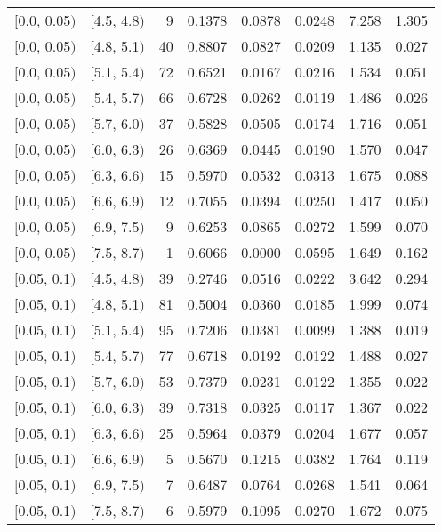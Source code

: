 \begin{longtable}{| l | l | r | r | r | r | r | r |}
        $[$0.0, 0.05$)$ & $[$4.5, 4.8$)$ & 9 & 0.1378 & 0.0878 & 0.0248 & 7.258 & 1.305 \\
        $[$0.0, 0.05$)$ & $[$4.8, 5.1$)$ & 40 & 0.8807 & 0.0827 & 0.0209 & 1.135 & 0.027 \\
        $[$0.0, 0.05$)$ & $[$5.1, 5.4$)$ & 72 & 0.6521 & 0.0167 & 0.0216 & 1.534 & 0.051 \\
        $[$0.0, 0.05$)$ & $[$5.4, 5.7$)$ & 66 & 0.6728 & 0.0262 & 0.0119 & 1.486 & 0.026 \\
        $[$0.0, 0.05$)$ & $[$5.7, 6.0$)$ & 37 & 0.5828 & 0.0505 & 0.0174 & 1.716 & 0.051 \\
        $[$0.0, 0.05$)$ & $[$6.0, 6.3$)$ & 26 & 0.6369 & 0.0445 & 0.0190 & 1.570 & 0.047 \\
        $[$0.0, 0.05$)$ & $[$6.3, 6.6$)$ & 15 & 0.5970 & 0.0532 & 0.0313 & 1.675 & 0.088 \\
        $[$0.0, 0.05$)$ & $[$6.6, 6.9$)$ & 12 & 0.7055 & 0.0394 & 0.0250 & 1.417 & 0.050 \\
        $[$0.0, 0.05$)$ & $[$6.9, 7.5$)$ & 9 & 0.6253 & 0.0865 & 0.0272 & 1.599 & 0.070 \\
        $[$0.0, 0.05$)$ & $[$7.5, 8.7$)$ & 1 & 0.6066 & 0.0000 & 0.0595 & 1.649 & 0.162 \\
        $[$0.05, 0.1$)$ & $[$4.5, 4.8$)$ & 39 & 0.2746 & 0.0516 & 0.0222 & 3.642 & 0.294 \\
        $[$0.05, 0.1$)$ & $[$4.8, 5.1$)$ & 81 & 0.5004 & 0.0360 & 0.0185 & 1.999 & 0.074 \\
        $[$0.05, 0.1$)$ & $[$5.1, 5.4$)$ & 95 & 0.7206 & 0.0381 & 0.0099 & 1.388 & 0.019 \\
        $[$0.05, 0.1$)$ & $[$5.4, 5.7$)$ & 77 & 0.6718 & 0.0192 & 0.0122 & 1.488 & 0.027 \\
        $[$0.05, 0.1$)$ & $[$5.7, 6.0$)$ & 53 & 0.7379 & 0.0231 & 0.0122 & 1.355 & 0.022 \\
        $[$0.05, 0.1$)$ & $[$6.0, 6.3$)$ & 39 & 0.7318 & 0.0325 & 0.0117 & 1.367 & 0.022 \\
        $[$0.05, 0.1$)$ & $[$6.3, 6.6$)$ & 25 & 0.5964 & 0.0379 & 0.0204 & 1.677 & 0.057 \\
        $[$0.05, 0.1$)$ & $[$6.6, 6.9$)$ & 5 & 0.5670 & 0.1215 & 0.0382 & 1.764 & 0.119 \\
        $[$0.05, 0.1$)$ & $[$6.9, 7.5$)$ & 7 & 0.6487 & 0.0764 & 0.0268 & 1.541 & 0.064 \\
        $[$0.05, 0.1$)$ & $[$7.5, 8.7$)$ & 6 & 0.5979 & 0.1095 & 0.0270 & 1.672 & 0.075 \\

\end{longtable}
